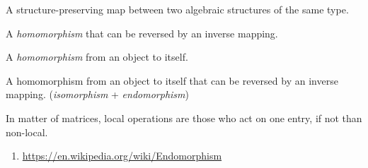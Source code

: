 





\begin{multicols}{3}
  A structure-preserving map between two algebraic structures of the same type.

  A \textit{homomorphism} that can be reversed by an inverse mapping.

  A \textit{homomorphism} from an object to itself.

  A homomorphism from an object to itself that can be reversed by an inverse mapping.
  (\textit{isomorphism} + \textit{endomorphism})

  In matter of matrices, local operations are those who act on one entry, if not than non-local.

\end{multicols}


\begin{enumerate}
\item \url{https://en.wikipedia.org/wiki/Endomorphism}
\end{enumerate}


